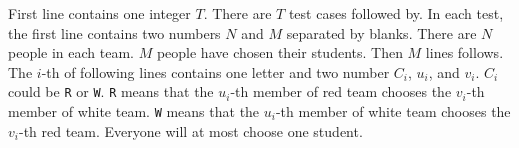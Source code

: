 First line contains one integer $T$. There are $T$ test cases followed by.
In each test, the first line contains two numbers $N$ and $M$ separated by 
blanks. There are $N$ people in each team. $M$ people have chosen their 
students. Then $M$ lines follows. The $i$-th of following lines contains 
one letter and two number $C_i$, $u_i$, and $v_i$. $C_i$ could be \verb+R+ 
or \verb+W+. \verb+R+ means that the $u_i$-th member of red team chooses 
the $v_i$-th member of white team. \verb+W+ means that the
$u_i$-th member of white team chooses the $v_i$-th red team. 
Everyone will at most choose one student.
